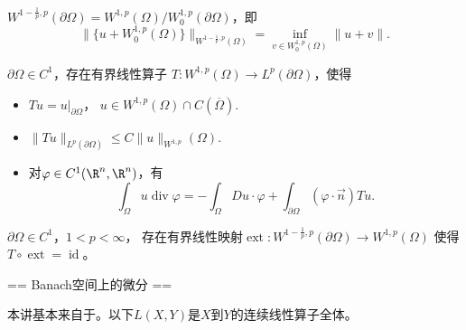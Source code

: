 $W^{1-\frac1p,p}(\partial\Omega)
=W^{1,p}(\Omega)/W_0^{1,p}(\partial\Omega)$，即
\[\|\{u+W_0^{1,p}(\Omega)\}\|_{W^{1-\frac1p,p}(\Omega)}
=\inf_{v\in W_0^{1,p}(\Omega)}\|u+v\|.\]
\begin{theorem}[迹定理]
    $\partial\Omega\in C^1$，存在有界线性算子
    $T\colon W^{1,p}(\Omega)\to L^p(\partial\Omega)$，使得
    \begin{itemize}
        \item $Tu=u|_{\partial\Omega}$，
        $u\in W^{1,p}(\Omega)\cap C(\overline{\Omega})$.
        \item $\|Tu\|_{L^p(\partial\Omega)}\le C\|u\|_{W^{1,p}}(\Omega)$.
        \item 对$\varphi\in C^1(\R^n,\R^n)$，有
        \[\int_\Omega u\operatorname{div}\varphi=-\int_\Omega Du\cdot\varphi
        +\int_{\partial\Omega}(\varphi\cdot\vec{n})Tu.\]
    \end{itemize}
\end{theorem}
\begin{theorem}
    $\partial\Omega\in C^1$，$1<p<\infty$，
    存在有界线性映射$\operatorname{ext}\colon 
    W^{1-\frac1p,p}(\partial\Omega)\to W^{1,p}(\Omega)$
    使得$T\circ\operatorname{ext}=\operatorname{id}$。
\end{theorem}

== Banach空间上的微分 ==

本讲基本来自于\cite{Zhang}。以下$L(X,Y)$是$X$到$Y$的连续线性算子全体。

